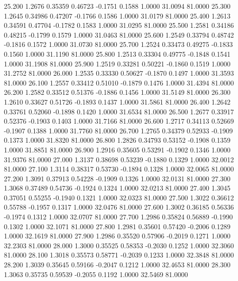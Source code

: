   25.200   1.2676   0.35359   0.46723  -0.1751   0.1588   1.0000  31.0094  81.0000
  25.300   1.2645   0.34986   0.47207  -0.1766   0.1586   1.0000  31.0179  81.0000
  25.400   1.2613   0.34591   0.47704  -0.1782   0.1583   1.0000  31.0295  81.0000
  25.500   1.2581   0.34186   0.48215  -0.1799   0.1579   1.0000  31.0463  81.0000
  25.600   1.2549   0.33794   0.48742  -0.1816   0.1572   1.0000  31.0730  81.0000
  25.700   1.2524   0.33473   0.49275  -0.1833   0.1560   1.0000  31.1190  81.0000
  25.800   1.2513   0.33304   0.49775  -0.1848   0.1541   1.0000  31.1908  81.0000
  25.900   1.2519   0.33281   0.50221  -0.1860   0.1519   1.0000  31.2752  81.0000
  26.000   1.2535   0.33330   0.50627  -0.1870   0.1497   1.0000  31.3593  81.0000
  26.100   1.2557   0.33412   0.51010  -0.1879   0.1476   1.0000  31.4394  81.0000
  26.200   1.2582   0.33512   0.51376  -0.1886   0.1456   1.0000  31.5149  81.0000
  26.300   1.2610   0.33627   0.51726  -0.1893   0.1437   1.0000  31.5861  81.0000
  26.400   1.2642   0.33761   0.52060  -0.1898   0.1420   1.0000  31.6534  81.0000
  26.500   1.2677   0.33917   0.52376  -0.1903   0.1403   1.0000  31.7166  81.0000
  26.600   1.2717   0.34113   0.52669  -0.1907   0.1388   1.0000  31.7760  81.0000
  26.700   1.2765   0.34379   0.52933  -0.1909   0.1373   1.0000  31.8320  81.0000
  26.800   1.2826   0.34793   0.53152  -0.1908   0.1359   1.0000  31.8851  81.0000
  26.900   1.2916   0.35605   0.53291  -0.1902   0.1346   1.0000  31.9376  81.0000
  27.000   1.3137   0.38698   0.53239  -0.1880   0.1329   1.0000  32.0012  81.0000
  27.100   1.3114   0.38317   0.53730  -0.1894   0.1328   1.0000  32.0065  81.0000
  27.200   1.3091   0.37913   0.54228  -0.1909   0.1326   1.0000  32.0131  81.0000
  27.300   1.3068   0.37489   0.54736  -0.1924   0.1324   1.0000  32.0213  81.0000
  27.400   1.3045   0.37051   0.55255  -0.1940   0.1321   1.0000  32.0323  81.0000
  27.500   1.3022   0.36612   0.55788  -0.1957   0.1317   1.0000  32.0476  81.0000
  27.600   1.3002   0.36185   0.56336  -0.1974   0.1312   1.0000  32.0707  81.0000
  27.700   1.2986   0.35824   0.56889  -0.1990   0.1302   1.0000  32.1071  81.0000
  27.800   1.2981   0.35601   0.57420  -0.2006   0.1289   1.0000  32.1619  81.0000
  27.900   1.2986   0.35520   0.57906  -0.2019   0.1271   1.0000  32.2303  81.0000
  28.000   1.3000   0.35525   0.58353  -0.2030   0.1252   1.0000  32.3060  81.0000
  28.100   1.3018   0.35573   0.58771  -0.2039   0.1233   1.0000  32.3848  81.0000
  28.200   1.3039   0.35645   0.59166  -0.2047   0.1212   1.0000  32.4653  81.0000
  28.300   1.3063   0.35735   0.59539  -0.2055   0.1192   1.0000  32.5469  81.0000
